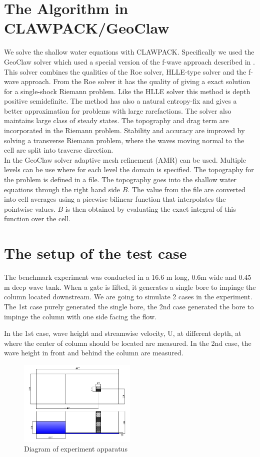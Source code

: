 \documentclass[11pt]{article}
\begin{document}
\section{The Algorithm in CLAWPACK/GeoClaw}\label{Sec:Algo}
We solve the shallow water equations with CLAWPACK. Specifically we used the GeoClaw solver which used a special version of the f-wave approach described in \cite{DLG}. This solver combines the qualities of the Roe solver, HLLE-type solver and the f-wave approach. From the Roe solver it has the quality of giving a exact solution for a single-shock Riemann problem. Like the HLLE solver this method is depth positive semidefinite. The method has also a natural entropy-fix and gives a better approximation for problems with large rarefactions. The solver also maintains large class of steady states.
The topography and drag term are incorporated in the Riemann problem. Stability and accuracy are improved by solving a transverse Riemann problem, where the waves moving normal to the cell are split into traverse direction.\\
In the GeoClaw solver adaptive mesh refinement (AMR) can be used. Multiple levels can be use where for each level the domain is specified. The topography for the problem is defined in a file. The topography goes into the shallow water equations through the right hand side $B$. The value from the file are converted into cell averages using a picewise bilinear function that interpolates the pointwise values. $B$ is then obtained by evaluating the exact integral of this function over the cell. 
\section{The setup of the test case}\label{Sec:Setup}
The benchmark experiment was conducted in a 16.6 m long, 0.6m wide and 0.45 m deep wave tank. When a gate is lifted, it generates a single bore to impinge the column located downstream.
We are going to simulate 2 cases in the experiment. The 1st case purely generated the single bore, the 2nd case generated the bore to impinge the column with one side facing the flow.
\par
In the 1st case, wave height and streamwise velocity, U, at different depth, at where the center of column should be located are measured. In the 2nd case, the wave height in front and behind the column are measured.
        \begin{figure}[h!]
            \centering
            \includegraphics[width=0.5\textwidth]{../proposal/figures/Diagram_case}
            \caption{Diagram of experiment apparatus}
        \end{figure}
\end{document}
